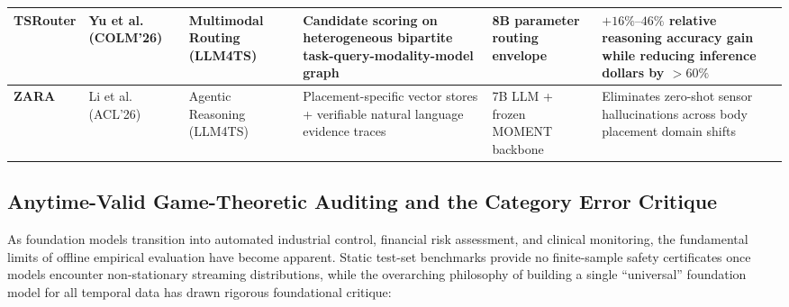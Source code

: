 \begin{table}[t]
{\begin{tabular}{llllll}
\midrule
\textbf{TSRouter} & Yu et al.~\cite{yu2026tsrouter} (COLM'26) & Multimodal Routing (LLM4TS) & Candidate scoring on heterogeneous bipartite task-query-modality-model graph & 8B parameter routing envelope & $+16\%\text{--}46\%$ relative reasoning accuracy gain while reducing inference dollars by $>60\%$ \\
\midrule
\textbf{ZARA} & Li et al.~\cite{li2025zara} (ACL'26) & Agentic Reasoning (LLM4TS) & Placement-specific vector stores + verifiable natural language evidence traces & 7B LLM + frozen MOMENT backbone & Eliminates zero-shot sensor hallucinations across body placement domain shifts \\
\bottomrule
\end{tabular}
}
\end{table}

\subsection{Anytime-Valid Game-Theoretic Auditing and the Category Error Critique}
\label{sec:anytime_auditing_category_error}

As foundation models transition into automated industrial control, financial risk assessment, and clinical monitoring, the fundamental limits of offline empirical evaluation have become apparent. Static test-set benchmarks provide no finite-sample safety certificates once models encounter non-stationary streaming distributions, while the overarching philosophy of building a single ``universal'' foundation model for all temporal data has drawn rigorous foundational critique:

